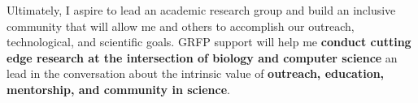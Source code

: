 Ultimately, I aspire to lead an academic research group and build an inclusive community that will allow me and others to accomplish our outreach, technological, and scientific goals.
GRFP support will help me \textbf{conduct cutting edge research at the intersection of biology and computer science} an lead in the conversation about the intrinsic value of \textbf{outreach, education, mentorship, and community in science}.
